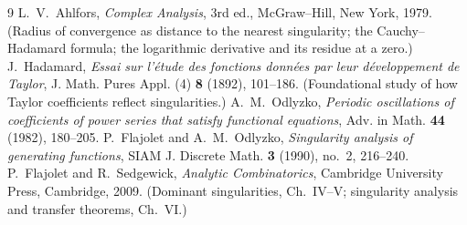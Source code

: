 \documentclass[11pt]{amsart}
\begin{document}
\begin{thebibliography}{9}
 L.~V.~Ahlfors, \emph{Complex Analysis}, 3rd ed., McGraw--Hill, New York, 1979.
  (Radius of convergence as distance to the nearest singularity; the Cauchy--Hadamard
  formula; the logarithmic derivative and its residue at a zero.)
 J.~Hadamard, \emph{Essai sur l'\'etude des fonctions donn\'ees par
  leur d\'eveloppement de Taylor}, J. Math. Pures Appl. (4) \textbf{8} (1892), 101--186.
  (Foundational study of how Taylor coefficients reflect singularities.)
 A.~M.~Odlyzko, \emph{Periodic oscillations of coefficients of power
  series that satisfy functional equations}, Adv. in Math. \textbf{44} (1982), 180--205.
 P.~Flajolet and A.~M.~Odlyzko, \emph{Singularity analysis of
  generating functions}, SIAM J. Discrete Math. \textbf{3} (1990), no.~2, 216--240.
 P.~Flajolet and R.~Sedgewick, \emph{Analytic Combinatorics},
  Cambridge University Press, Cambridge, 2009. (Dominant singularities, Ch.~IV--V;
  singularity analysis and transfer theorems, Ch.~VI.)
\end{thebibliography}
\end{document}
